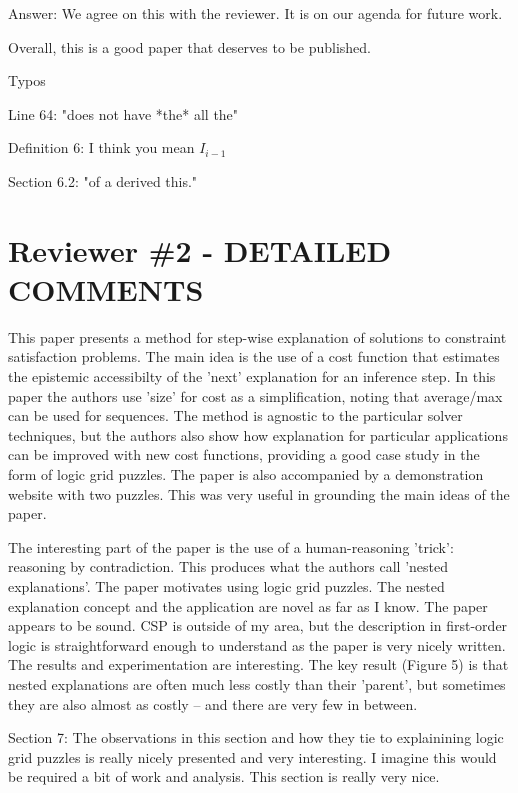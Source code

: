 \documentclass{article}
\newcommand\comment[1]{\marginpar{\tiny #1}}
\renewcommand\comment[1]{#1}
\newcommand{\emilio}[1]{{\comment{Answer: \color{red}#1}}}
\newcommand{\new}[1]{{\comment{{\color{blue} #1}}}}
\begin{document}
\emilio{We agree on this with the reviewer. It is on our agenda for future work.}

Overall, this is a good paper that deserves to be published. 

Typos

Line 64: "does not have *the* all the"

Definition 6: I think you mean $I_{i-1}
$

Section 6.2: "of a derived this."



\section*{Reviewer \#2 - DETAILED COMMENTS}

This paper presents a method for step-wise explanation of solutions to
constraint satisfaction problems. The main idea is the use of a cost
function that estimates the epistemic accessibilty of the 'next'
explanation for an inference step. In this paper the authors use 'size'
for cost as a simplification, noting that average/max can be used for
sequences.  The method is agnostic to the particular solver techniques,
but the authors also show how explanation for particular applications
can be improved with new cost functions, providing a good case study in
the form of logic grid puzzles. The paper is also accompanied by a
demonstration website with two puzzles. This was very useful in
grounding the main ideas of the paper.

The interesting part of the paper is the use of a human-reasoning
'trick': reasoning by contradiction. This produces what the authors
call 'nested explanations'. The paper motivates using logic grid
puzzles. The nested explanation concept and the application are novel
as far as I know. The paper appears to be sound. CSP is outside of my
area, but the description in first-order logic is straightforward
enough to understand as the paper is very nicely written. The results
and experimentation are interesting. The key result (Figure 5) is that
nested explanations are often much less costly than their 'parent', but
sometimes they are also almost as costly -- and there are very few in
between.


Section 7: The observations in this section and how they tie to
explainining logic grid puzzles is really nicely presented and very
interesting. I imagine this would be required a bit of work and
analysis. This section is really very nice.
\end{document}
